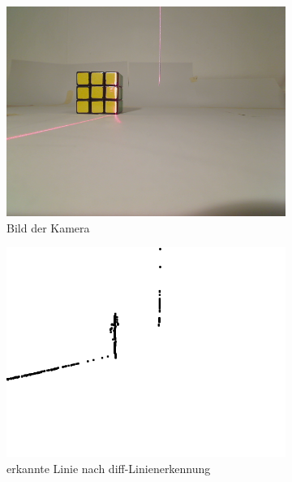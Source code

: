 \documentclass[ngerman,a4paper,parskip=half]{scrartcl}
\begin{document}
\begin{figure}[H]
	\begin{subfigure}{0.32\textwidth}
		\includegraphics[width=\textwidth]{includes/yellow_0.png}
		\caption{Bild der Kamera\\}
		\label{fig:yellow_0_cam}
	\end{subfigure}
	\hfill
	\begin{subfigure}{0.32\textwidth}
		\includegraphics[width=\textwidth]{includes/yellow_0_diff.png}
		\caption{erkannte Linie nach diff-Linienerkennung}
		\label{fig:yellow_0_diff}
	\end{subfigure}
	\hfill
	\begin{subfigure}{0.32\textwidth}

\end{subfigure}
\end{figure}
\end{document}
